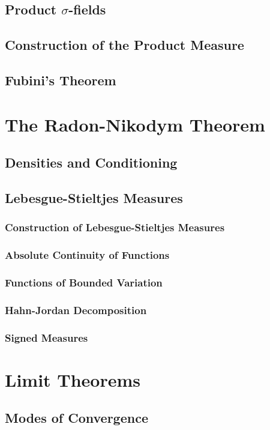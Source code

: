 \documentclass{article}
\newcommand{\0}{{\bf{0}}}
\newcommand{\1}{{\bf{1}}}
\begin{document}
\subsection{Product $\sigma$-fields}
\subsection{Construction of the Product Measure}
\subsection{Fubini's Theorem}
\clearpage
\section{The Radon-Nikodym Theorem}
\subsection{Densities and Conditioning}
\subsection{Lebesgue-Stieltjes Measures}
\subsubsection{Construction of Lebesgue-Stieltjes Measures}
\subsubsection{Absolute Continuity of Functions}
\subsubsection{Functions of Bounded Variation}
\subsubsection{Hahn-Jordan Decomposition}
\subsubsection{Signed Measures}
\clearpage
\section{Limit Theorems}
\subsection{Modes of Convergence}
\clearpage
\end{document}
